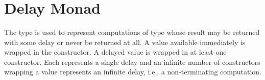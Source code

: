 \documentclass[preliminary,copyright,creativecommons]{eptcs}
\newenvironment{code}{\verbatim}{\endverbatim}
\begin{document}
{\begin{code}
\>[2]\<[9]\>[9]\AgdaSymbol{\{} \AgdaSymbol{:}   \AgdaSymbol{\}\{} \AgdaSymbol{:}   \AgdaSymbol{\}}     \<\\
\>[2]\<[9]\>[9]        \<\\
\>     \AgdaSymbol{=} \<\\
\\
\> \AgdaSymbol{:}  \AgdaSymbol{\{}\AgdaSymbol{\}} \AgdaSymbol{\{} \AgdaSymbol{:}  \AgdaSymbol{\}} \AgdaSymbol{\{}  \AgdaSymbol{:} \AgdaSymbol{\}}        \<\\
\>  \AgdaSymbol{=} \<\end{code}
}
\section{Delay Monad}

The  type is used to represent computations of type
 whose result may be returned with some delay or never
be returned at all. A value available immediately is wrapped in the
 constructor. A delayed value is wrapped in at least one
 constructor. Each  represents a single delay and an
infinite number of  constructors wrapping a value
represents an infinite delay, i.e., a non-terminating computation.
\end{document}
